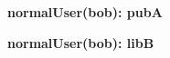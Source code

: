 \documentclass{article}
\begin{document}
{\begin{minipage}{\tableWidth}
\begin{description}[align=left,leftmargin=1em,noitemsep,labelsep=\parindent]
\item\textbf{{normalUser(\allowbreak{}bob): pubA}}
\item\textbf{{normalUser(\allowbreak{}bob): libB}}
\end{description}\end{minipage}}
\end{document}
